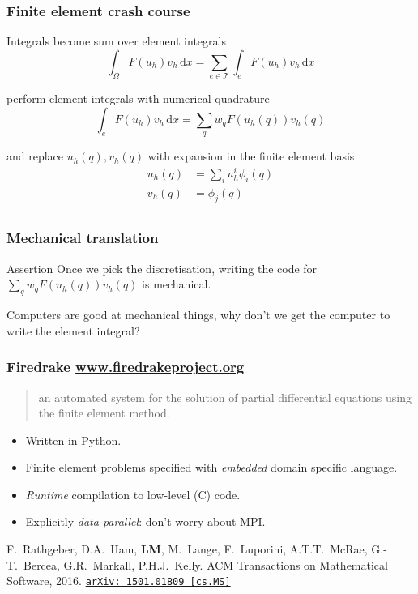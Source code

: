 \documentclass[presentation]{beamer}
\newcommand{\arxivlink}[2]{%
  \href{http://www.arxiv.org/abs/#1}%
  {\texttt{arXiv:\,#1\,[#2]}}%
}
\begin{document}
\begin{frame}
  \frametitle{Finite element crash course}
  Integrals become sum over element integrals
  \begin{equation*}
    \int_\Omega\! F(u_h) v_h \, \text{d}x =
    \sum_{e \in \mathcal{T}} \int_e\! F(u_h)v_h\, \text{d}x
  \end{equation*}

  perform element integrals with numerical quadrature
  \begin{equation*}
    \int_e F(u_h)v_h\,\text{d}x = \sum_q w_q F(u_h(q)) v_h(q)
  \end{equation*}

  and replace $u_h(q), v_h(q)$ with expansion in the finite element basis
  \begin{align*}
    u_h(q) &= \sum_i u_h^i \phi_i(q)\\
    v_h(q) &= \phi_j(q)\\
  \end{align*}
\end{frame}

\begin{frame}[fragile]
  \frametitle{Mechanical translation}
  \begin{block}{Assertion}
    Once we pick the discretisation, writing the code for $\sum_q w_q
    F(u_h(q)) v_h(q)$ is mechanical.
  \end{block}
  \begin{corollary}
    Computers are good at mechanical things, why don't we get the
    computer to write the element integral?
  \end{corollary}
\end{frame}

\begin{frame}
  \frametitle{Firedrake \url{www.firedrakeproject.org}}

  \begin{quote}
    {\normalfont [\ldots]} an automated system for the solution of partial
    differential equations using the finite element method.
  \end{quote}

  \begin{itemize}
  \item Written in Python.
  \item Finite element problems specified with \emph{embedded} domain
    specific language.
  \item \emph{Runtime} compilation to low-level (C) code.
  \item Explicitly \emph{data parallel}: don't worry about MPI.
  \end{itemize}

  \begin{flushright}
    {\scriptsize F.~Rathgeber, D.A.~Ham, \textbf{LM}, M.~Lange,
      F.~Luporini, A.T.T.~McRae, G.-T.~Bercea, G.R.~Markall,
      P.H.J.~Kelly. ACM Transactions on Mathematical Software,
      2016. \arxivlink{1501.01809}{cs.MS}\nocite{Rathgeber:2016}}
  \end{flushright}
\end{frame}
\end{document}
